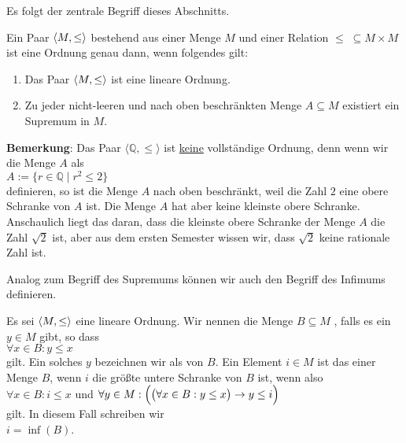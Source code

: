 \noindent
Es folgt der zentrale Begriff dieses Abschnitts.

\begin{Definition}
  Ein Paar $\pair(M, \leq)$ bestehend aus einer Menge $M$ und einer Relation $\leq\; \subseteq M \times M$ 
  ist eine  Ordnung genau dann, wenn folgendes gilt:
  \begin{enumerate}
  \item Das Paar $\pair(M, \leq)$ ist eine lineare Ordnung.
  \item Zu jeder nicht-leeren und nach oben beschränkten Menge $A \subseteq M$ existiert ein
        Supremum in $M$. \edx
  \end{enumerate}
\end{Definition}
\vspace*{-0.2cm}


\noindent
\textbf{Bemerkung}:
Das Paar $\langle \mathbb{Q}, \leq \rangle$ ist \underline{keine} vollständige Ordnung, denn wenn wir die Menge
$A$ als
\\[0.2cm]
\hspace*{1.3cm}
$A := \{ r \in \mathbb{Q} \mid r^2 \leq 2 \}$
\\[0.2cm]
definieren, so ist die Menge $A$ nach oben beschränkt, weil die Zahl $2$ eine obere
Schranke von $A$ ist.  Die Menge $A$ hat aber keine kleinste obere Schranke.  Anschaulich liegt das
daran, dass die kleinste obere Schranke  der Menge $A$ die Zahl $\sqrt{2}$ ist, aber aus dem ersten
Semester wissen wir, dass $\sqrt{2}$ keine rationale Zahl ist.  \eox
\vspace*{0.2cm}

\noindent
Analog zum Begriff des Supremums können wir auch den Begriff des Infimums definieren.

\begin{Definition}[Infimum]
Es sei $\pair(M, \leq)$ eine lineare Ordnung.  Wir nennen die Menge $B \subseteq M$ \linebreak
{}, falls es ein
 $y \in M$ gibt, so dass 
\\[0.2cm]
\hspace*{1.3cm}
$\forall x \in B:  y \leq x$
\\[0.2cm]
gilt.  Ein solches $y$ bezeichnen wir als   von $B$.
Ein Element $i \in M$ ist das  einer Menge $B$, wenn $i$ die größte
untere Schranke von $B$ ist, wenn also 
\\[0.2cm]
\hspace*{1.3cm}
$\forall x \in B: i \leq x$ \quad \mbox{und} \quad
$\forall y \in M: \Bigl(\bigl(\forall x \in B: y \leq x \bigr)\rightarrow y \leq i \Bigr)$
\\[0.2cm]
gilt.  In diesem Fall schreiben wir
\\[0.2cm]
\hspace*{1.3cm}
$i = \inf(B)$.
\edx
\end{Definition}


